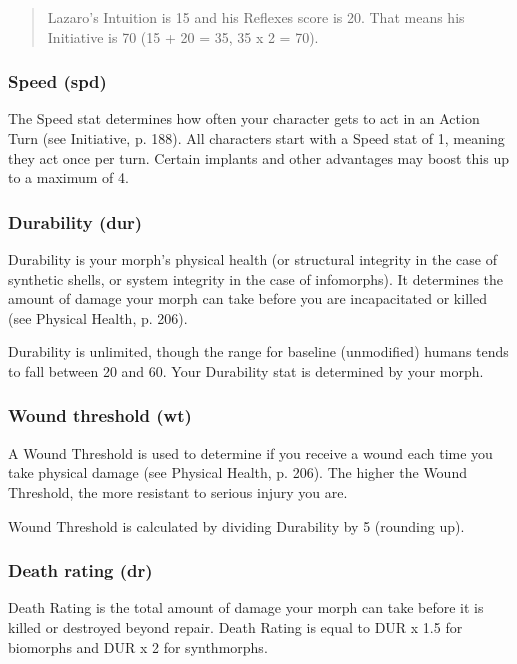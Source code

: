 \begin{quotation} Lazaro's Intuition is 15 and his Reflexes score is 20. That means his Initiative is 70 (15 + 20 = 35, 35 x 2 = 70). \end{quotation} 

\subsubsection{Speed (spd)} \label{sec:speed-spd} 

The Speed stat determines how often your character gets to act in an Action Turn (see Initiative, p. 188). All characters start with a Speed stat of 1, meaning they act once per turn. Certain implants and other advantages may boost this up to a maximum of 4. 

\subsubsection{Durability (dur)} \label{sec:durability-dur} 

Durability is your morph's physical health (or structural integrity in the case of synthetic shells, or system integrity in the case of infomorphs). It determines the amount of damage your morph can take before you are incapacitated or killed (see Physical Health, p. 206). 

Durability is unlimited, though the range for baseline (unmodified) humans tends to fall between 20 and 60. Your Durability stat is determined by your morph. 

\subsubsection{Wound threshold (wt)} \label{sec:wound-threshold-wt} 

A Wound Threshold is used to determine if you receive a wound each time you take physical damage (see Physical Health, p. 206). The higher the Wound Threshold, the more resistant to serious injury you are. 

Wound Threshold is calculated by dividing Durability by 5 (rounding up). 

\subsubsection{Death rating (dr)} \label{sec:death-rating-dr} 

Death Rating is the total amount of damage your morph can take before it is killed or destroyed beyond repair. Death Rating is equal to DUR x 1.5 for biomorphs and DUR x 2 for synthmorphs. 

